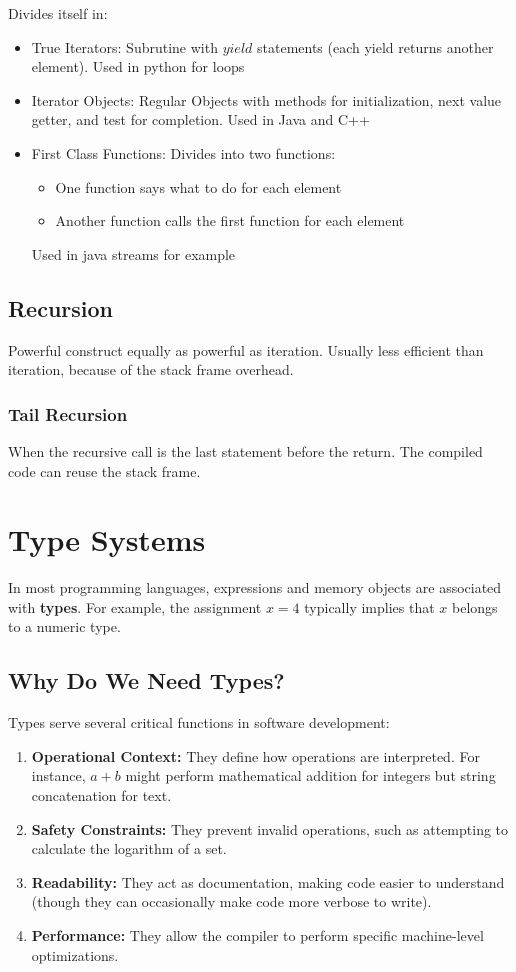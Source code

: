 \documentclass{article}
\begin{document}
Divides itself in:
\begin{itemize}
  \item True Iterators: Subrutine with $yield$ statements (each yield returns another element). Used in python for loops
  \item Iterator Objects: Regular Objects with methods for initialization, next value getter, and test for completion. Used in Java and C++
  \item First Class Functions: Divides into two functions:
  \begin{itemize}
    \item One function says what to do for each element
    \item Another function calls the first function for each element
  \end{itemize}
  Used in java streams for example
\end{itemize}
\subsection{Recursion}
Powerful construct equally as powerful as iteration. Usually less efficient than iteration, because of the stack frame overhead.

\subsubsection{Tail Recursion}
When the recursive call is the last statement before the return. The compiled code can reuse the stack frame.

\section{Type Systems}

In most programming languages, expressions and memory objects are associated with \textbf{types}. For example, the assignment $x = 4$ typically implies that $x$ belongs to a numeric type.

\subsection{Why Do We Need Types?}
Types serve several critical functions in software development:
\begin{enumerate}
    \item \textbf{Operational Context:} They define how operations are interpreted. For instance, $a + b$ might perform mathematical addition for integers but string concatenation for text.
    \item \textbf{Safety Constraints:} They prevent invalid operations, such as attempting to calculate the logarithm of a set.
    \item \textbf{Readability:} They act as documentation, making code easier to understand (though they can occasionally make code more verbose to write).
    \item \textbf{Performance:} They allow the compiler to perform specific machine-level optimizations.
\end{enumerate}
\end{document}
